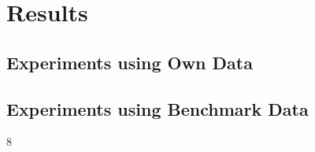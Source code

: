 \chapter{Results}

\graphicspath{ {report/Chapter6/assets/} } 

\section{Experiments using Own Data}

\section{Experiments using Benchmark Data}
8